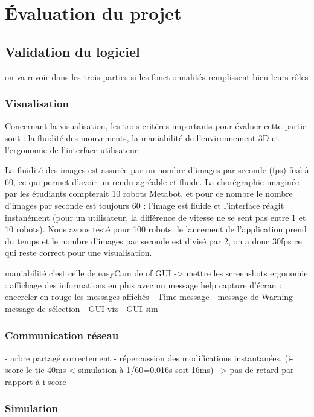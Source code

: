 \section{Évaluation du projet}
\subsection{Validation du logiciel} %

on va revoir dans les trois parties si les fonctionnalités remplissent bien leurs rôles
\subsubsection{Visualisation}

Concernant la visualisation, les trois critères importants pour évaluer cette partie sont : la fluidité des mouvements, la maniabilité de l'environnement 3D et l'ergonomie de l'interface utilisateur. 

La fluidité des images est assurée par un nombre d'images par seconde (fps) fixé à 60, ce qui permet d'avoir un rendu agréable et fluide. La chorégraphie imaginée par les étudiants compterait 10 robots Metabot, et pour ce nombre le nombre d'images par seconde est toujours 60 : l'image est fluide et l'interface réagit instanément (pour un utilisateur, la différence de vitesse ne se sent pas entre 1 et 10 robots).
Nous avons testé pour 100 robots, le lancement de l'application prend du temps et le nombre d'images par seconde est divisé par 2, on a donc 30fps ce qui reste correct pour une visualisation. 




maniabilité c'est celle de easyCam de of
GUI -> mettre les screenshots
ergonomie : affichage des informations en plus avec un message help
capture d'écran : encercler en rouge les messages affichés
- Time message
- message de Warning
- message de sélection
- GUI viz
- GUI sim



\subsubsection{Communication réseau}

- arbre partagé correctement
- répercussion des modifications instantanées, (i-score le tic 40ms < simulation à 1/60=0.016s soit 16ms)
--> pas de retard par rapport à i-score

\subsubsection{Simulation}

